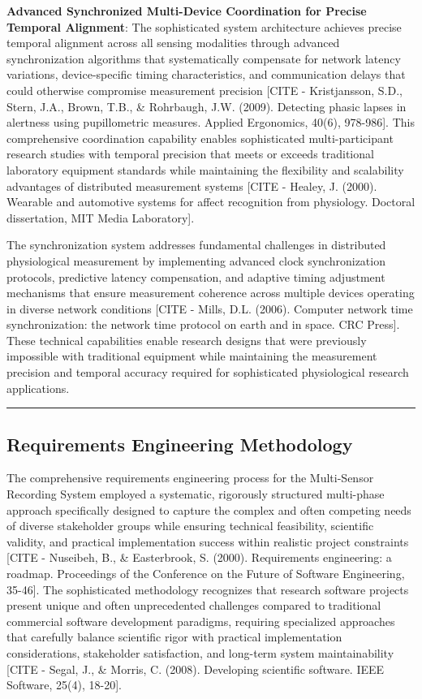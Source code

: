 \documentclass[11pt,a4paper]{report}
\begin{document}
\textbf{Advanced Synchronized Multi-Device Coordination for Precise Temporal Alignment}: The sophisticated system
architecture achieves precise temporal alignment across all sensing modalities through advanced synchronization
algorithms that systematically compensate for network latency variations, device-specific timing characteristics, and
communication delays that could otherwise compromise measurement
precision [CITE - Kristjansson, S.D., Stern, J.A., Brown, T.B., \& Rohrbaugh, J.W. (2009). Detecting phasic lapses in alertness using pupillometric measures. Applied Ergonomics, 40(6), 978-986].
This comprehensive coordination capability enables sophisticated multi-participant research studies with temporal
precision that meets or exceeds traditional laboratory equipment standards while maintaining the flexibility and
scalability advantages of distributed measurement
systems [CITE - Healey, J. (2000). Wearable and automotive systems for affect recognition from physiology. Doctoral dissertation, MIT Media Laboratory].

The synchronization system addresses fundamental challenges in distributed physiological measurement by implementing
advanced clock synchronization protocols, predictive latency compensation, and adaptive timing adjustment mechanisms
that ensure measurement coherence across multiple devices operating in diverse network
conditions [CITE - Mills, D.L. (2006). Computer network time synchronization: the network time protocol on earth and in space. CRC Press].
These technical capabilities enable research designs that were previously impossible with traditional equipment while
maintaining the measurement precision and temporal accuracy required for sophisticated physiological research
applications.

\hrule

\subsection{Requirements Engineering Methodology}

The comprehensive requirements engineering process for the Multi-Sensor Recording System employed a systematic,
rigorously structured multi-phase approach specifically designed to capture the complex and often competing needs of
diverse stakeholder groups while ensuring technical feasibility, scientific validity, and practical implementation
success within realistic project
constraints [CITE - Nuseibeh, B., \& Easterbrook, S. (2000). Requirements engineering: a roadmap. Proceedings of the Conference on the Future of Software Engineering, 35-46].
The sophisticated methodology recognizes that research software projects present unique and often unprecedented
challenges compared to traditional commercial software development paradigms, requiring specialized approaches that
carefully balance scientific rigor with practical implementation considerations, stakeholder satisfaction, and long-term
system
maintainability [CITE - Segal, J., \& Morris, C. (2008). Developing scientific software. IEEE Software, 25(4), 18-20].
\end{document}
